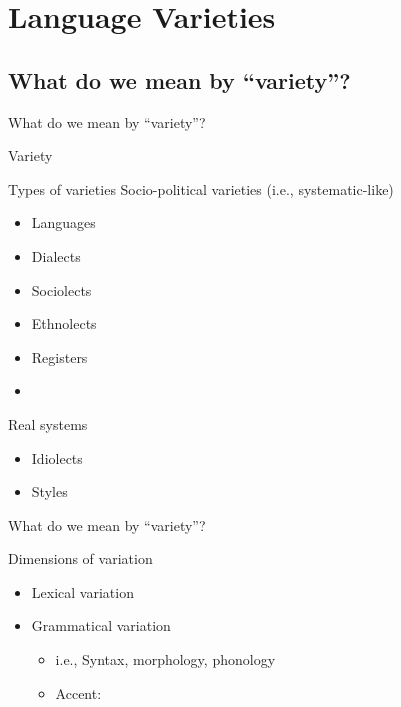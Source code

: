 \documentclass{beamer}
\newcommand{\subtwoone}{What do we mean by ``variety''?}
\begin{document}
  \section{Language Varieties}
    \subsection{\subtwoone}
      \begin{frame}{\subtwoone}
        \begin{alertblock}{Variety}
          
        \end{alertblock}
        \begin{block}{Types of varieties}
          Socio-political varieties (i.e., systematic-like)
          \parbox{0.48\linewidth}{
            \begin{itemize}
              \item Languages
              \item Dialects
              \item Sociolects
            \end{itemize}
          }
          \parbox{0.48\linewidth}{
            \begin{itemize}
              \item Ethnolects
              \item Registers
              \item[]
            \end{itemize}
          }
          Real systems
          \begin{itemize}
            \item Idiolects
            \item Styles
          \end{itemize}
        \end{block}
      \end{frame}

      \begin{frame}{\subtwoone}
        \begin{block}{Dimensions of variation}
          \begin{itemize}
            \item Lexical variation
            \item Grammatical variation
            \begin{itemize}
              \item i.e., Syntax, morphology, phonology
              \item \alert{Accent}: 
            \end{itemize}
          \end{itemize}
        \end{block}
      \end{frame}
\end{document}
